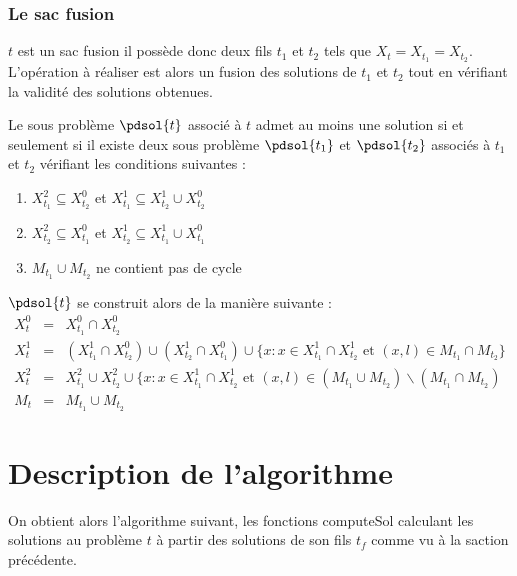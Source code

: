 \subsubsection{Le sac fusion}

$t$ est un sac fusion il possède donc deux fils $t_1$ et $t_2$ tels que $X_t = X_{t_1} = X_{t_2}$.
L'opération à réaliser est alors un fusion des solutions de $t_1$ et $t_2$ tout en vérifiant la
validité des solutions obtenues.

\begin{nlemma}
    Le sous problème $\pdsol{t}$ associé à $t$ admet au moins une solution si et seulement si il
    existe deux sous problème $\pdsol{t_1}$ et $\pdsol{t_2}$ associés à $t_1$ et $t_2$ vérifiant les
    conditions suivantes :
    \begin{enumerate}
        \item $X_{t_1}^2 \subseteq X_{t_2}^0$ et $X_{t_1}^1 \subseteq X_{t_2}^1 \cup X_{t_2}^0$
        \item $X_{t_2}^2 \subseteq X_{t_1}^0$ et $X_{t_2}^1 \subseteq X_{t_1}^1 \cup X_{t_1}^0$
        \item $M_{t_1} \cup M_{t_2}$ ne contient pas de cycle
    \end{enumerate}
    $\pdsol{t}$ se construit alors de la manière suivante :
    \[
        \begin{array}{rcl}
            X_t^0 & = & X_{t_1}^0 \cap X_{t_2}^0 \\
            X_t^1 & = & (X_{t_1}^1 \cap X_{t_2}^0) \cup (X_{t_2}^1 \cap X_{t_1}^0) \cup \{ x : x \in
            X_{t_1}^1 \cap X_{t_2}^1 \mbox{ et } (x, l) \in M_{t_1} \cap M_{t_2}\} \\
            X_t^2 & = & X_{t_1}^2 \cup X_{t_2}^2 \cup \{x : x \in X_{t_1}^1 \cap X_{t_2}^1 \mbox{ et } 
            (x,l) \in (M_{t_1} \cup M_{t_2}) \backslash (M_{t_1} \cap M_{t_2}) \\
            M_t & = & M_{t_1} \cup M_{t_2}
        \end{array}
    \]
\end{nlemma}

\section{Description de l'algorithme}

On obtient alors l'algorithme suivant, les fonctions computeSol calculant les solutions au problème
$t$ à partir des solutions de son fils $t_f$ comme vu à la saction précédente.

